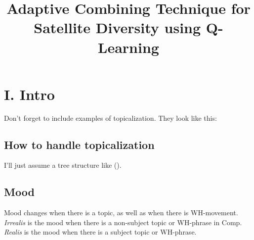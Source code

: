 \documentclass[conference]{IEEEtran}
\begin{document}
\title{Adaptive Combining Technique for Satellite Diversity using Q-Learning}
\author{
}
\section*{I. Intro}

Don't forget to include examples of topicalization.
They look like this:

{\small
{}
}

\subsection*{How to handle topicalization}

I'll just assume a tree structure like ().

{\small
{}
}

\subsection*{Mood}

Mood changes when there is a topic, as well as when
there is WH-movement.  \emph{Irrealis} is the mood when
there is a non-subject topic or WH-phrase in Comp.
\emph{Realis} is the mood when there is a subject topic
or WH-phrase.
\end{document}
